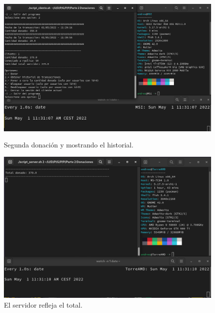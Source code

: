 \documentclass{article}
\begin{document}
\begin{figure}[H]
    \centering
    \begin{minipage}[H]{0.49\textwidth}
        \centering
        \includegraphics[width=\textwidth]{imagenes/multiples ordenadores/Cliente/Screenshot from 2022-05-01 11-31-13.png}
        \caption{Segunda donación y mostrando el historial.}
    \end{minipage}
    \hfill
    \begin{minipage}[H]{0.49\textwidth}
        \centering
        \includegraphics[width=\textwidth]{imagenes/multiples ordenadores/Servidor/Screenshot from 2022-05-01 11-31-13.png}
        \caption{El servidor refleja el total.}
    \end{minipage}
\end{figure}
\end{document}
